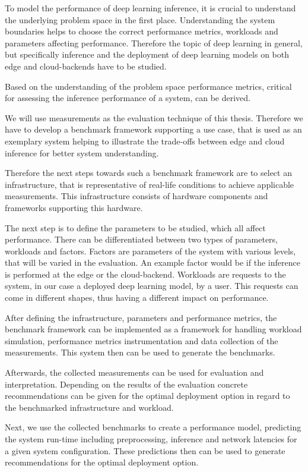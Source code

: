 To model the performance of deep learning inference, it is crucial to understand the underlying problem space in the first place.
Understanding the system boundaries helps to choose the correct performance metrics, workloads and parameters affecting performance.
Therefore the topic of deep learning in general, but specifically inference and the deployment of deep learning models on both edge and cloud-backends have to be studied.

Based on the understanding of the problem space performance metrics, critical for assessing the inference performance of a system, can be derived.

We will use measurements as the evaluation technique of this thesis. 
Therefore we have to develop a benchmark framework supporting a use case, that is used as an exemplary system helping to illustrate the trade-offs between edge and cloud inference for better system understanding.

Therefore the next steps towards such a benchmark framework are to select an infrastructure, that is representative of real-life conditions to achieve applicable measurements. 
This infrastructure consists of hardware components and frameworks supporting this hardware. 

The next step is to define the parameters to be studied, which all affect performance.
There can be differentiated between two types of parameters, workloads and factors.
Factors are parameters of the system with various levels, that will be varied in the evaluation. An example factor would be if the inference is performed at the edge or the cloud-backend.
Workloads are requests to the system, in our case a deployed deep learning model, by a user.
This requests can come in different shapes, thus having a different impact on performance.



After defining the infrastructure, parameters and performance metrics, the benchmark framework can be implemented as a framework for handling workload simulation, performance metrics instrumentation and data collection of the measurements.
This system then can be used to generate the benchmarks. 

Afterwards, the collected measurements can be used for evaluation and interpretation.
Depending on the results of the evaluation concrete recommendations can be given for the optimal deployment option in regard to the benchmarked infrastructure and workload.

Next, we use the collected benchmarks to create a performance model, predicting the system run-time including preprocessing, inference and network latencies for a given system configuration.
These predictions then can be used to generate recommendations for the optimal deployment option.

